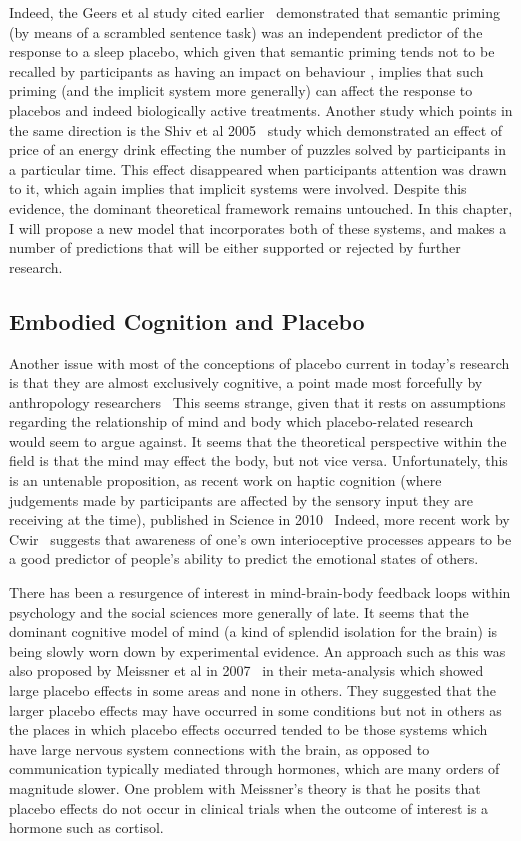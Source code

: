 Indeed, the Geers et al study cited earlier~\cite{Geers2005} demonstrated that semantic priming (by means of a scrambled sentence task) was an independent predictor of the response to a sleep placebo, which given that semantic priming tends not to be recalled by participants as having an impact on behaviour \cite{Wittenbrink2007}, implies that such priming (and the implicit system more generally) can affect the response to placebos and indeed biologically active treatments. Another study which points in the same direction is the Shiv et al 2005~\cite{Shiv2005a} study which demonstrated an effect of price of an energy drink effecting the number of puzzles solved by participants in a particular time. This effect disappeared when participants attention was drawn to it, which again implies that implicit systems were involved. Despite this evidence, the dominant theoretical framework remains untouched. In this chapter, I will propose a new model that incorporates both of these systems, and makes a number of predictions that will be either supported or rejected by further research. 

\subsection{Embodied Cognition and Placebo}
\label{sec:embod-cogn-plac}
Another issue with most of the conceptions of placebo current in today's research is that they are almost exclusively cognitive, a point made most forcefully by anthropology researchers~\cite{Thompson2009}  %
This seems strange, given that it rests on assumptions regarding the relationship of mind and body which placebo-related research would seem to argue against. It seems that the theoretical perspective within the field is that the mind may effect the body, but not vice versa. Unfortunately, this is an untenable proposition, as recent work on haptic cognition (where judgements made by participants are affected by the sensory input they are receiving at the time), published in Science in 2010~\cite{ackerman2010incidental}
Indeed, more recent work by Cwir~\cite{cwir2011your} suggests that awareness of one's own interioceptive processes appears to be a good predictor of people's ability to predict the emotional states of others. 


There has been a resurgence of interest in mind-brain-body feedback loops within psychology and the social sciences more generally of late. It seems that the dominant cognitive model of mind (a kind of splendid isolation for the brain) is being slowly worn down by experimental evidence. An approach such as this was also proposed by Meissner et al in 2007~\cite{Meissner2007} in their meta-analysis which showed large placebo effects in some areas and none in others. They suggested that the larger placebo effects may have occurred in some conditions but not in others as the places in which placebo effects occurred tended to be those systems which have large nervous system connections with the brain, as opposed to communication typically mediated through hormones, which are many orders of magnitude slower. One problem with Meissner's theory is that he posits that placebo effects do not occur in clinical trials when the outcome of interest is a hormone such as cortisol. 


